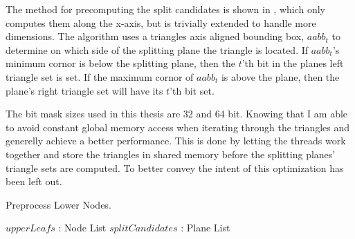 The method for precomputing the split candidates is shown in
, which only computes them along the
x-axis, but is trivially extended to handle more dimensions. The
algorithm uses a triangles axis aligned bounding box, $aabb_t$ to
determine on which side of the splitting plane the triangle is
located. If $aabb_t$'s minimum cornor is below the splitting plane,
then the $t$'th bit in the planes left triangle set is set. If the
maximum cornor of $aabb_t$ is above the plane, then the plane's right
triangle set will have its $t$'th bit set.


The bit mask sizes used in this thesis are 32 and 64 bit. Knowing that
I am able to avoid constant global memory access when iterating
through the triangles and generelly achieve a better performance. This
is done by letting the threads work together and store the triangles
in shared memory before the splitting planes' triangle sets are
computed. To better convey the intent of
 this optimization has been left out.


\begin{algorithm}
  \caption{Preprocess Lower Nodes.}
  \label{alg:calcSplittingPlanes}
  \begin{algorithmic}
              {$upperLeafs$ : Node List}
              {$splitCandidates$ : Plane List}{
                    \ENDFOR
                  \ENDFOR
                \ENDFOR
              }
  \end{algorithmic}
\end{algorithm}




